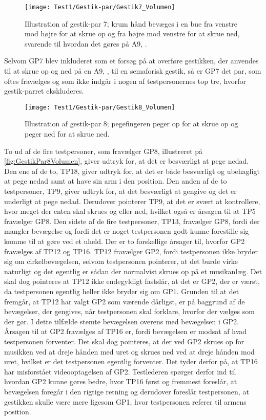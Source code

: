 %
\begin{figure}[H]
	\centering
	\texttt{[image: Test1/Gestik-par/Gestik7\_Volumen]}
	\caption{Illustration af gestik-par 7; krum hånd bevæges i en bue fra venstre mod højre for at skrue op og fra højre mod venstre for at skrue ned, svarende til hvordan det gøres på A9, \parencite{WEB:BeoplayA9}.}
	\label{fig:GestikPar7Volumen}
\end{figure}
\noindent
%
Selvom GP7 blev inkluderet som et forsøg på at overføre gestikken, der anvendes til at skrue op og ned på en A9, \parencite{WEB:BeoplayA9}, til en semaforisk gestik, så er GP7 det par, som oftes fravælges og som ikke indgår i nogen af testpersonernes top tre, hvorfor gestik-parret ekskluderes.
%
\begin{figure}[H]
	\centering
	\texttt{[image: Test1/Gestik-par/Gestik8\_Volumen]}
	\caption{Illustration af gestik-par 8; pegefingeren peger op for at skrue op og peger ned for at skrue ned.}
	\label{fig:GestikPar8Volumen}
\end{figure}
\noindent
%
To ud af de fire testpersoner, som fravælger GP8, illustreret på \autoref{fig:GestikPar8Volumen}, giver udtryk for, at det er besværligt at pege nedad. Den ene af de to, TP18, giver udtryk for, at det er både besværligt og ubehagligt at pege nedad samt at have sin arm i den position. Den anden af de to testpersoner, TP9, giver udtryk for, at det besværligt at gengive og det er underligt at pege nedad. Derudover pointerer TP9, at det er svært at kontrollere, hvor meget der enten skal skrues og eller ned, hvilket også er årsagen til at TP5 fravælger GP8. Den sidste af de fire testpersoner, TP13, fravælger GP8, fordi der mangler bevægelse og fordi det er noget testpersonen godt kunne forestille sig komme til at gøre ved et uheld. \blankline 
%
Der er to forskellige årsager til, hvorfor GP2 fravælges af TP12 og TP16. TP12 fravælger GP2, fordi testpersonen ikke bryder sig om cirkelbevægelsen, selvom testpersonen pointerer, at det burde virke naturligt og det egentlig er sådan der normalvist skrues op på et musikanlæg. Det skal dog pointeres at TP12 ikke endegyldigt fastslår, at det er GP2, der er værst, da testpersonen egentlig heller ikke bryder sig om GP1. Grunden til at det fremgår, at TP12 har valgt GP2 som værende dårligst, er på baggrund af de bevægelser, der gengives, når testpersonen skal forklare, hvorfor der vælges som der gør. I dette tilfælde stemte bevægelsen overens med bevægelsen i GP2. Årsagen til at GP2 fravælges af TP16 er, fordi bevægelsen er modsat af hvad testpersonen forventer. Det skal dog pointeres, at der ved GP2 skrues op for musikken ved at dreje hånden med uret og skrues ned ved at dreje hånden mod uret, hvilket er det testpersonen egentlig forventer. Det tyder derfor på, at TP16 har misforstået videooptagelsen af GP2. Testlederen spørger derfor ind til hvordan GP2 kunne gøres bedre, hvor TP16 først og fremmest foreslår, at bevægelsen foregår i den rigtige retning og derudover foreslår testpersonen, at gestikken skulle være mere ligesom GP1, hvor testpersonen referer til armens position. 

